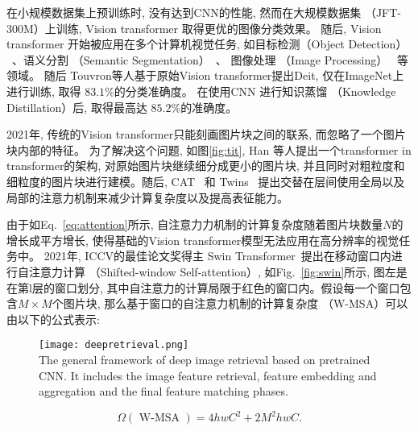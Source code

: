 在小规模数据集上预训练时, 没有达到CNN的性能, 然而在大规模数据集 （JFT-300M）上训练, Vision transformer 取得更优的图像分类效果。 随后, Vision transformer 开始被应用在多个计算机视觉任务, 如目标检测（Object Detection） ~\cite{carion2020end, zhu2021deformable}、语义分割 （Semantic Segmentation）~\cite{zheng2021rethinking, xie2021segformer, strudel2021segmenter, jin2021trseg, zhu2021unified}、 图像处理 （Image Processing）~\cite{chen2021pre} 等领域。 随后 Touvron等人基于原始Vision transformer提出Deit, 仅在ImageNet上进行训练, 取得 $83.1\%$的分类准确度。 在使用CNN 进行知识蒸馏 （Knowledge Distillation）后, 取得最高达 $85.2\%$的准确度。\par

2021年, 传统的Vision transformer只能刻画图片块之间的联系, 而忽略了一个图片块内部的特征。 为了解决这个问题, 如图\ref{fig:tit}, Han 等人提出一个transformer in transformer的架构, 对原始图片块继续细分成更小的图片块, 并且同时对粗粒度和细粒度的图片块进行建模。随后, CAT~\cite{lin2022cat} 和 Twins~\cite{chu2021twins} 提出交替在层间使用全局以及局部的注意力机制来减少计算复杂度以及提高表征能力。\par

由于如Eq.~\ref{eq:attention}所示, 自注意力力机制的计算复杂度随着图片块数量$N$的增长成平方增长, 使得基础的Vision transformer模型无法应用在高分辨率的视觉任务中。 2021年, ICCV的最佳论文奖得主 Swin Transformer~\cite{liu2021swin}提出在移动窗口内进行自注意力计算 （Shifted-window Self-attention）, 如Fig.~\ref{fig:swin}所示, 图左是在第l层的窗口划分, 其中自注意力的计算局限于红色的窗口内。假设每一个窗口包含$M \times M$个图片块, 那么基于窗口的自注意力机制的计算复杂度 （W-MSA）可以由以下的公式表示:

\begin{figure}[!htp]
    \centering
    \texttt{[image: deepretrieval.png]} \\
      {The general framework of deep image retrieval based on pretrained CNN. It includes the image feature retrieval, feature embedding and aggregation and the final feature matching phases. }
   \label{fig:retrieval}
\end{figure}

\begin{equation}
    \Omega(\text { W-MSA })=4 h w C^2+2 M^2 hwC.
\end{equation}

